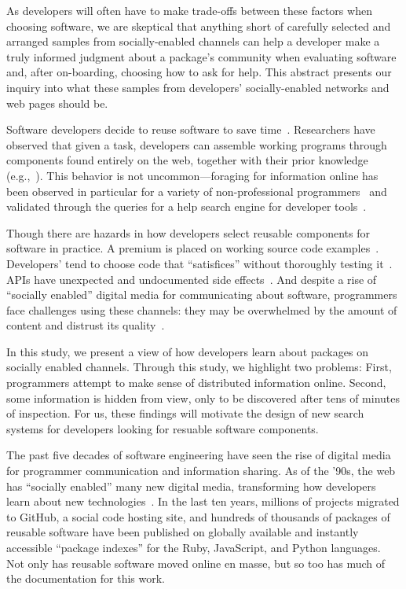 As developers will often have to make trade-offs between these factors when choosing software, we are skeptical that anything short of carefully selected and arranged samples from socially-enabled channels can help a developer make a truly informed judgment about a package's community when evaluating software and, after on-boarding, choosing how to ask for help.
This abstract presents our inquiry into what these samples from developers' socially-enabled networks and web pages should be.

Software developers decide to reuse software to save time~\cite{mili_reusing_1995}.
Researchers have observed that given a task, developers can assemble working programs through components found entirely on the web, together with their prior knowledge (e.g.,~\cite{brandt_two_2009}).
This behavior is not uncommon---foraging for information online has been observed in particular for a variety of non-professional programmers~\cite{brandt_opportunistic_2008} and validated through the queries for a help search engine for developer tools~\cite{brandt_two_2009}.

Though there are hazards in how developers select reusable components for software in practice.
A premium is placed on working source code examples~\cite{nykaza_what_2002}.
Developers' tend to choose code that ``satisfices'' without thoroughly testing it~\cite{brandt_two_2009}.
APIs have unexpected and undocumented side effects~\cite{robillard_field_2011}.
And despite a rise of ``socially enabled'' digital media for communicating about software, programmers face challenges using these channels:
they may be overwhelmed by the amount of content and distrust its quality~\cite{storey_revolution_2014}.

In this study, we present a view of how developers learn about packages on socially enabled channels.
Through this study, we highlight two problems:
First, programmers attempt to make sense of distributed information online.
Second, some information is hidden from view, only to be discovered after tens of minutes of inspection.
For us, these findings will motivate the design of new search systems for developers looking for resuable software components.
\fi


The past five decades of software engineering have seen the rise of digital media for programmer communication and information sharing.
As of the '90s, the web has ``socially enabled'' many new digital media, transforming how developers learn about new technologies~\cite{storey_revolution_2014}.
In the last ten years, millions of projects migrated to GitHub, a social code hosting site, and hundreds of thousands of packages of reusable software have been published on globally available and instantly accessible ``package indexes'' for the Ruby, JavaScript, and Python languages.
Not only has reusable software moved online en masse, but so too has much of the documentation for this work.

